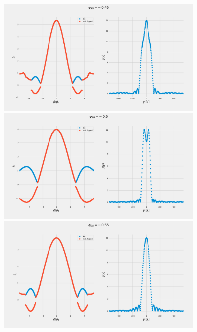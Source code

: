 \documentclass[a4paper]{article}
\begin{document}
\begin{figure}
	\includegraphics[width=0.9\textwidth]{figs/wg31double/current_and_density_045}
	\includegraphics[width=0.9\textwidth]{figs/wg31double/current_and_density_05}
	\includegraphics[width=0.9\textwidth]{figs/wg31double/current_and_density_055}
\end{figure}
\end{document}
